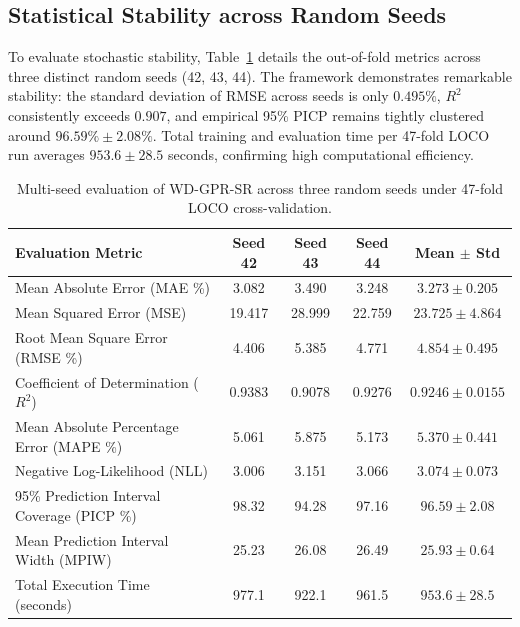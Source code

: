 \documentclass[a4paper,fleqn]{cas-sc}
\begin{document}
\subsection{Statistical Stability across Random Seeds}
To evaluate stochastic stability, Table~\ref{tab:seed_metrics} details the out-of-fold metrics across three distinct random seeds (42, 43, 44). The framework demonstrates remarkable stability: the standard deviation of RMSE across seeds is only $0.495\%$, $R^2$ consistently exceeds $0.907$, and empirical 95\% PICP remains tightly clustered around $96.59\% \pm 2.08\%$. Total training and evaluation time per 47-fold LOCO run averages $953.6 \pm 28.5$ seconds, confirming high computational efficiency.

\begin{table}[pos=htbp]
\centering
\caption{Multi-seed evaluation of WD-GPR-SR across three random seeds under 47-fold LOCO cross-validation.}
\label{tab:seed_metrics}
\small
\renewcommand{\arraystretch}{1.15}
\begin{tabular}{lcccc}
\toprule
\textbf{Evaluation Metric} & \textbf{Seed 42} & \textbf{Seed 43} & \textbf{Seed 44} & \textbf{Mean $\pm$ Std} \\
\midrule
Mean Absolute Error (MAE \%) & 3.082 & 3.490 & 3.248 & $3.273 \pm 0.205$ \\
Mean Squared Error (MSE) & 19.417 & 28.999 & 22.759 & $23.725 \pm 4.864$ \\
Root Mean Square Error (RMSE \%) & 4.406 & 5.385 & 4.771 & $4.854 \pm 0.495$ \\
Coefficient of Determination ($R^2$) & 0.9383 & 0.9078 & 0.9276 & $0.9246 \pm 0.0155$ \\
Mean Absolute Percentage Error (MAPE \%) & 5.061 & 5.875 & 5.173 & $5.370 \pm 0.441$ \\
Negative Log-Likelihood (NLL) & 3.006 & 3.151 & 3.066 & $3.074 \pm 0.073$ \\
95\% Prediction Interval Coverage (PICP \%) & 98.32 & 94.28 & 97.16 & $96.59 \pm 2.08$ \\
Mean Prediction Interval Width (MPIW) & 25.23 & 26.08 & 26.49 & $25.93 \pm 0.64$ \\
Total Execution Time (seconds) & 977.1 & 922.1 & 961.5 & $953.6 \pm 28.5$ \\
\bottomrule
\end{tabular}
\end{table}
\end{document}
